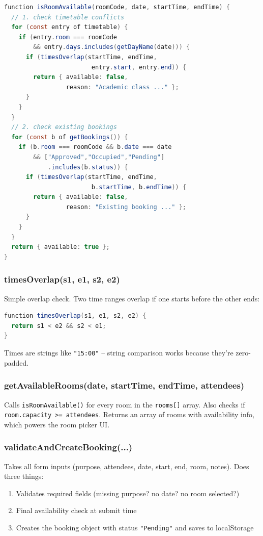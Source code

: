 \documentclass[12pt,a4paper]{article}
\begin{document}
\begin{lstlisting}[language=Java]
function isRoomAvailable(roomCode, date, startTime, endTime) {
  // 1. check timetable conflicts
  for (const entry of timetable) {
    if (entry.room === roomCode
        && entry.days.includes(getDayName(date))) {
      if (timesOverlap(startTime, endTime,
                        entry.start, entry.end)) {
        return { available: false,
                 reason: "Academic class ..." };
      }
    }
  }
  // 2. check existing bookings
  for (const b of getBookings()) {
    if (b.room === roomCode && b.date === date
        && ["Approved","Occupied","Pending"]
            .includes(b.status)) {
      if (timesOverlap(startTime, endTime,
                        b.startTime, b.endTime)) {
        return { available: false,
                 reason: "Existing booking ..." };
      }
    }
  }
  return { available: true };
}
\end{lstlisting}

\subsubsection{timesOverlap(s1, e1, s2, e2)}

Simple overlap check. Two time ranges overlap if one starts before the other ends:

\begin{lstlisting}[language=Java]
function timesOverlap(s1, e1, s2, e2) {
  return s1 < e2 && s2 < e1;
}
\end{lstlisting}

Times are strings like \texttt{"15:00"} -- string comparison works because they're zero-padded.

\subsubsection{getAvailableRooms(date, startTime, endTime, attendees)}

Calls \texttt{isRoomAvailable()} for every room in the \texttt{rooms[]} array. Also checks if \texttt{room.capacity >= attendees}. Returns an array of rooms with availability info, which powers the room picker UI.

\subsubsection{validateAndCreateBooking(...)}

Takes all form inputs (purpose, attendees, date, start, end, room, notes). Does three things:
\begin{enumerate}
  \item Validates required fields (missing purpose? no date? no room selected?)
  \item Final availability check at submit time
  \item Creates the booking object with status \texttt{"Pending"} and saves to localStorage
\end{enumerate}
\end{document}
